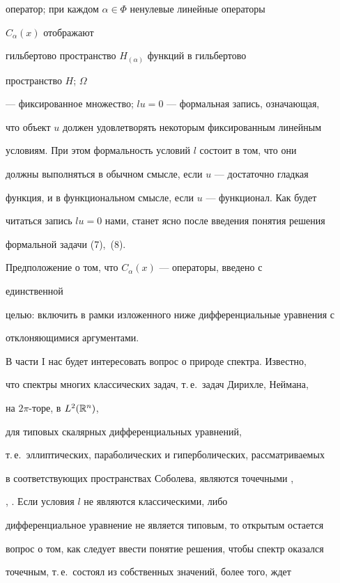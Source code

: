 оператор; при каждом $\alpha\in\Phi$ ненулевые линейные операторы 


$C_\alpha(x)$ отображают 


гильбертово пространство $H_{(\alpha)}$ функций в гильбертово 


пространство $H$; $\Omega$ 


--- фиксированное множество; $lu=0$ --- формальная запись, означающая, 


что объект $u$ должен удовлетворять некоторым фиксированным линейным 


условиям. При этом формальность условий $l$ состоит в том, что они 


должны выполняться в обычном смысле, если $u$ --- достаточно гладкая 


функция, и в функциональном смысле, если $u$ --- функционал. Как будет 


читаться запись $lu=0$ нами, станет ясно после введения понятия решения 


формальной задачи (7),~(8). 


 


Предположение о том, что $C_\alpha(x)$ --- операторы, введено с 


единственной 


целью: включить в рамки изложенного ниже дифференциальные уравнения с 


отклоняющимися аргументами. 


 


В части I нас будет интересовать вопрос о природе спектра. Известно, 


что спектры многих классических задач, т.\,е.~задач Дирихле, Неймана, 


на $2\pi$-торе, в $L^2(\Bbb R^n)$, 


для типовых скалярных дифференциальных уравнений, 


т.\,е.~эллиптических, параболических и гиперболических, рассматриваемых 


в соответствующих пространствах Соболева, являются точечными \cite{1}, 


\cite{4}, \cite{5}. Если условия $l$ не являются классическими, либо 


дифференциальное уравнение не является типовым, то открытым остается 


вопрос о том, как следует ввести понятие решения, чтобы спектр оказался 


точечным, т.\,е.~состоял из собственных значений, более того, ждет 


